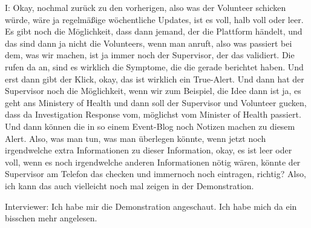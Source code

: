 I: Okay, nochmal zur{\"u}ck zu den vorherigen, also was der Volunteer schicken w{\"u}rde, w{\"a}re ja regelm{\"a}ßige w{\"o}chentliche Updates, ist es voll, halb voll oder leer. Es gibt noch die M{\"o}glichkeit, dass dann jemand, der die Plattform h{\"a}ndelt, und das sind dann ja nicht die Volunteers, wenn man anruft, also was passiert bei dem, was wir machen, ist ja immer noch der Supervisor, der das validiert. Die rufen da an, sind es wirklich die Symptome, die die gerade berichtet haben. Und erst dann gibt der Klick, okay, das ist wirklich ein True-Alert. Und dann hat der Supervisor noch die M{\"o}glichkeit, wenn wir zum Beispiel, die Idee dann ist ja, es geht ans Ministery of Health und dann soll der Supervisor und Volunteer gucken, dass da Investigation Response vom, m{\"o}glichst vom Minister of Health passiert. Und dann k{\"o}nnen die in so einem Event-Blog noch Notizen machen zu diesem Alert. Also, was man tun, was man {\"u}berlegen k{\"o}nnte, wenn jetzt noch irgendwelche extra Informationen zu dieser Information, okay, es ist leer oder voll, wenn es noch irgendwelche anderen Informationen n{\"o}tig w{\"a}ren, k{\"o}nnte der Supervisor am Telefon das checken und immernoch noch eintragen, richtig? Also, ich kann das auch vielleicht noch mal zeigen in der Demonstration.

Interviewer: Ich habe mir die Demonstration angeschaut. Ich habe mich da ein bisschen mehr angelesen. 

